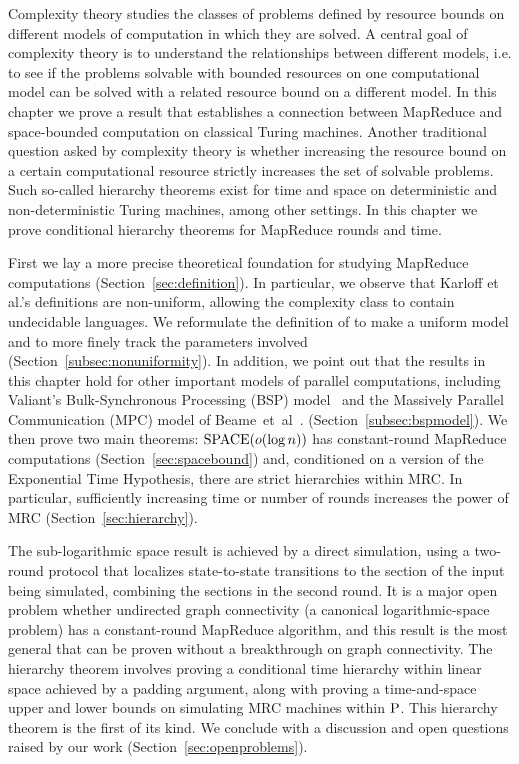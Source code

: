 Complexity theory studies the classes of problems defined by resource bounds on
different models of computation in which they are solved. A central goal of
complexity theory is to understand the relationships between different models,
i.e. to see if the problems solvable with bounded resources on one
computational model can be solved with a related resource bound on a different
model.  In this chapter we prove a result that establishes a connection between
MapReduce and space-bounded computation on classical Turing machines.  Another
traditional question asked by complexity theory is whether increasing the
resource bound on a certain computational resource strictly increases the set
of solvable problems. Such so-called hierarchy theorems exist for time and
space on deterministic and non-deterministic Turing machines, among other
settings.  In this chapter we prove conditional hierarchy theorems for MapReduce
rounds and time.

First we lay a more precise theoretical foundation for studying MapReduce
computations (Section~\ref{sec:definition}).  In particular, we observe that
Karloff et al.'s definitions are non-uniform, allowing the complexity class to
contain undecidable languages.  We reformulate the definition of
\cite{Karloff10} to make a uniform model and to more finely track the
parameters involved (Section~\ref{subsec:nonuniformity}).  In addition, we
point out that the results in this chapter hold for other important models of
parallel computations, including Valiant's Bulk-Synchronous Processing (BSP)
model~\cite{Valiant90} and the Massively Parallel Communication (MPC) model of
Beame~et~al~\cite{BeameKS13}.  (Section~\ref{subsec:bspmodel}).  We then prove
two main theorems: $\SPACE(o(\log n))$ has constant-round MapReduce
computations (Section~\ref{sec:spacebound}) and, conditioned on a version of
the Exponential Time Hypothesis, there are strict hierarchies within MRC.  In
particular, sufficiently increasing time or number of rounds increases the
power of MRC (Section~\ref{sec:hierarchy}).

The sub-logarithmic space result is achieved by a direct simulation, using a
two-round protocol that localizes state-to-state transitions to the section of
the input being simulated, combining the sections in the second round. It is a
major open problem whether undirected graph connectivity (a canonical
logarithmic-space problem) has a constant-round MapReduce algorithm, and this 
result is the most general that can be proven without a breakthrough on graph
connectivity.  The hierarchy theorem involves proving a conditional time
hierarchy within linear space achieved by a padding argument, along with
proving a time-and-space upper and lower bounds on simulating MRC machines
within $\P$. This hierarchy theorem is the first of its kind. We conclude with
a discussion and open questions raised by our work
(Section~\ref{sec:openproblems}).


